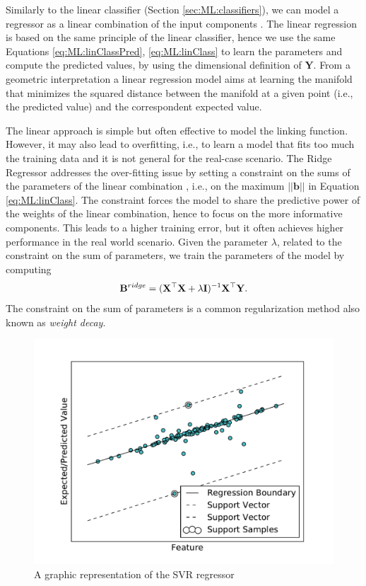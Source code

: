 Similarly to the linear classifier (Section \ref{sec:ML:classifiers}), we can model a regressor as a linear combination of the input components \cite{Sen1990}. The linear regression \cite{PAMI} is based on the same principle of the linear classifier, hence we use the same Equations \ref{eq:ML:linClassPred}, \ref{eq:ML:linClass} to learn the parameters and compute the predicted values, by using the dimensional definition of $\mathbf{Y}$. From a geometric interpretation a linear regression model aims at learning the manifold that minimizes the squared distance between the manifold at a given point (i.e., the predicted value) and the correspondent expected value.

The linear approach is simple but often effective to model the linking function. However, it may also lead to overfitting, i.e., to learn a model that fits too much the training data and it is not general for the real-case scenario. The Ridge Regressor addresses the over-fitting issue by setting a constraint on the sums of the parameters of the linear combination \cite{PAMI}, i.e., on the maximum $||\mathbf{b}||$ in Equation \ref{eq:ML:linClass}. The constraint forces the model to share the predictive power of the weights of the linear combination, hence to focus on the more informative components. This leads to a higher training error, but it often achieves higher performance in the real world scenario. Given the parameter $\lambda$, related to the constraint on the sum of parameters, we train the parameters of the model by computing \cite{PAMI}
\begin{equation}
\mathbf{B}^{ridge}=(\mathbf{X}^\top \mathbf{X}+\lambda \mathbf{I})^{-1}  \mathbf{X}^\top  \mathbf{Y}.
\label{eq:ML:ridge}
\end{equation}
The constraint on the sum of parameters is a common regularization method also known as \textit{weight decay}.

\begin{figure}[tbp]
	\begin{center}
		\includegraphics[width=12cm]{img/ML/ML_SVR}
	\end{center}
	\caption{A graphic representation of the SVR regressor}
	\label{fig:ML:SVR}
\end{figure}

